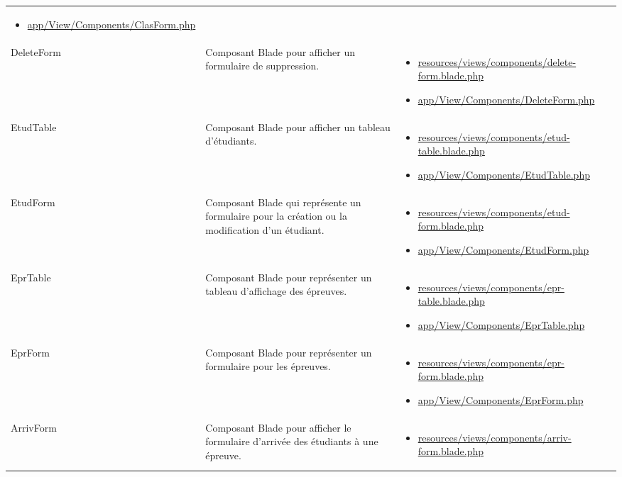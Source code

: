 \begin{table}[H]
\begin{adjustbox}{width=\textwidth}
\begin{tabular}{|l|p{}|p{}|}
\begin{itemize}
				\item \url{app/View/Components/ClasForm.php} \end{itemize} \\
			DeleteForm 		& Composant Blade pour afficher un formulaire de suppression. 												& \begin{itemize}\item \url{resources/views/components/delete-form.blade.php}
				\item \url{app/View/Components/DeleteForm.php} \end{itemize} \\
			EtudTable 		& Composant Blade pour afficher un tableau d'étudiants. 														& \begin{itemize}\item \url{resources/views/components/etud-table.blade.php}
				\item \url{app/View/Components/EtudTable.php} \end{itemize} \\
			EtudForm 		& Composant Blade qui représente un formulaire pour la création ou la modification d'un étudiant. 			& \begin{itemize}\item \url{resources/views/components/etud-form.blade.php}
				\item \url{app/View/Components/EtudForm.php} \end{itemize} \\
			EprTable 		& Composant Blade pour représenter un tableau d'affichage des épreuves. 										& \begin{itemize}\item \url{resources/views/components/epr-table.blade.php}
				\item \url{app/View/Components/EprTable.php} \end{itemize} \\
			EprForm 		& Composant Blade pour représenter un formulaire pour les épreuves. 											& \begin{itemize}\item \url{resources/views/components/epr-form.blade.php}
				\item \url{app/View/Components/EprForm.php} \end{itemize} \\
			ArrivForm 		& Composant Blade pour afficher le formulaire d'arrivée des étudiants à une épreuve. 							& \begin{itemize}\item \url{resources/views/components/arriv-form.blade.php}

\end{itemize}
\end{tabular}
\end{adjustbox}
\end{table}
